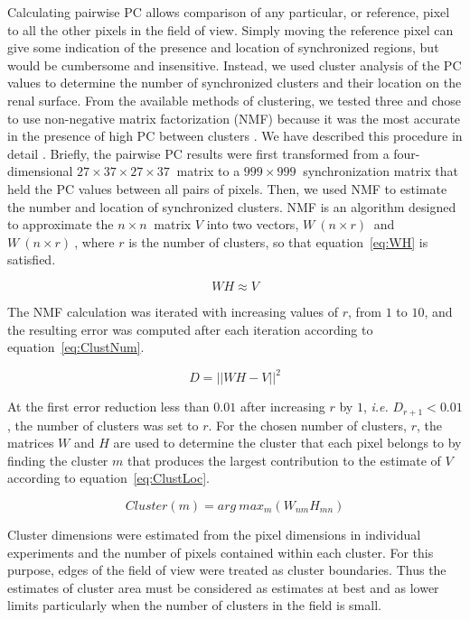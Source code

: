 	Calculating pairwise PC allows comparison of any particular, or reference, pixel to all the other pixels in the field of view. Simply moving the reference pixel can give some indication of the presence and location of synchronized regions, but would be cumbersome and insensitive. Instead, we used cluster analysis of the PC values to determine the number of synchronized clusters and their location on the renal surface. From the available methods of clustering, we tested three and chose to use non-negative matrix factorization (NMF) because it was the most accurate in the presence of high PC between clusters \cite{Scully14}. We have described this procedure in detail \cite{Scully14}. Briefly, the pairwise PC results were first transformed from a four-dimensional $27 \times 37 \times 27 \times 37 \ $ matrix to a $999 \times 999 \ $ synchronization matrix that held the PC values between all pairs of pixels. Then, we used NMF to estimate the number and location of synchronized clusters. NMF is an algorithm designed to approximate the $n \times n \ $ matrix $V$ into two vectors, $W \ (n \times r) \ $ and $W \ (n \times r) \ $, where $r$ is the number of clusters, so that equation~\ref{eq:WH} is satisfied.
	
\begin{equation}
WH \approx V
\label{eq:WH}
\end{equation}

	The NMF calculation was iterated with increasing values of $r$, from $1$ to $10$, and the resulting error was computed after each iteration according to equation~\ref{eq:ClustNum}. 

\begin{equation}
D = \lvert \lvert WH - V \rvert \rvert ^2
\label{eq:ClustNum}
\end{equation}

	At the first error reduction less than $0.01$ after increasing $r$ by $1$, \emph{i.e.} $D_{r+1} < 0.01$, the number of clusters was set to $r$. For the chosen number of clusters, $r$, the matrices $W$ and $H$ are used to determine the cluster that each pixel belongs to by finding the cluster $m$ that produces the largest contribution to the estimate of $V$ according to equation~\ref{eq:ClustLoc}.

\begin{equation}
Cluster(m) = arg \ max_m(W_{nm}H_{mn})
\label{eq:ClustLoc}
\end{equation}

	Cluster dimensions were estimated from the pixel dimensions in individual experiments and the number of pixels contained within each cluster. For this purpose, edges of the field of view were treated as cluster boundaries. Thus the estimates of cluster area must be considered as estimates at best and as lower limits particularly when the number of clusters in the field is small.

